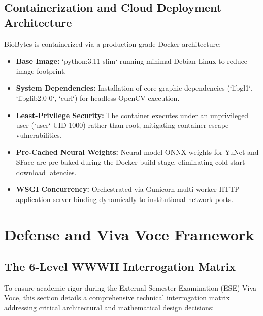 \documentclass[12pt,a4paper,oneside]{report}
\begin{document}
\section{Containerization and Cloud Deployment Architecture}
BioBytes is containerized via a production-grade Docker architecture:
\begin{itemize}
    \item \textbf{Base Image:} `python:3.11-slim` running minimal Debian Linux to reduce image footprint.
    \item \textbf{System Dependencies:} Installation of core graphic dependencies (`libgl1`, `libglib2.0-0`, `curl`) for headless OpenCV execution.
    \item \textbf{Least-Privilege Security:} The container executes under an unprivileged user (`user` UID 1000) rather than root, mitigating container escape vulnerabilities.
    \item \textbf{Pre-Cached Neural Weights:} Neural model ONNX weights for YuNet and SFace are pre-baked during the Docker build stage, eliminating cold-start download latencies.
    \item \textbf{WSGI Concurrency:} Orchestrated via Gunicorn multi-worker HTTP application server binding dynamically to institutional network ports.
\end{itemize}

\chapter{Defense and Viva Voce Framework}

\section{The 6-Level WWWH Interrogation Matrix}
To ensure academic rigor during the External Semester Examination (ESE) Viva Voce, this section details a comprehensive technical interrogation matrix addressing critical architectural and mathematical design decisions:
\end{document}
